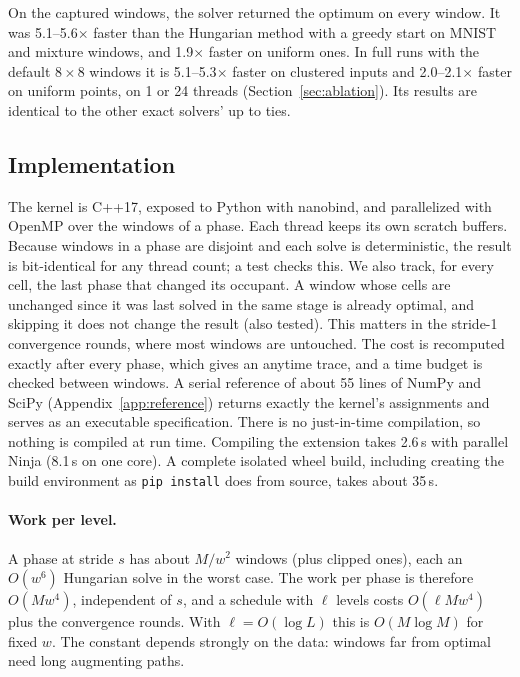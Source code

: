 On the captured windows, the solver returned the optimum on every window. It was 5.1--5.6$\times$ faster
than the Hungarian method with a greedy start on MNIST and mixture windows, and
1.9$\times$ faster on uniform ones. In full runs with the default $8\times8$ windows it is
5.1--5.3$\times$ faster on clustered inputs and 2.0--2.1$\times$ faster on uniform points, on 1
or 24 threads (Section~\ref{sec:ablation}). Its results are identical to the other exact
solvers' up to ties.
\subsection{Implementation}
\label{sec:impl}

The kernel is C++17, exposed to Python with nanobind, and parallelized with OpenMP over
the windows of a phase. Each thread keeps its own scratch buffers. Because windows in a
phase are disjoint and each solve is deterministic, the result is bit-identical for any
thread count; a test checks this. We also track, for every cell, the last phase that
changed its occupant. A window whose cells are unchanged since it was last solved in the
same stage is already optimal, and skipping it does not change the result (also tested).
This matters in the stride-1 convergence rounds, where most windows are untouched. The
cost is recomputed exactly after every phase, which gives an anytime trace, and a time
budget is checked between windows. A serial reference of about 55 lines of NumPy and SciPy
(Appendix~\ref{app:reference}) returns exactly the kernel's assignments and serves as an
executable specification. There is no just-in-time compilation, so nothing is compiled at run time. Compiling the
extension takes 2.6\,s with parallel Ninja (8.1\,s on one core). A complete isolated wheel
build, including creating the build environment as \texttt{pip install} does from source,
takes about 35\,s.

\paragraph{Work per level.} A phase at stride $s$ has about $M/w^2$ windows (plus clipped
ones), each an $O(w^6)$ Hungarian solve in the worst case. The work per phase is
therefore $O(Mw^4)$, independent of $s$, and a schedule with $\ell$ levels costs
$O(\ell M w^4)$ plus the convergence rounds. With $\ell=O(\log L)$ this is
$O(M\log M)$ for fixed $w$. The constant depends strongly on the data: windows far from
optimal need long augmenting paths.

